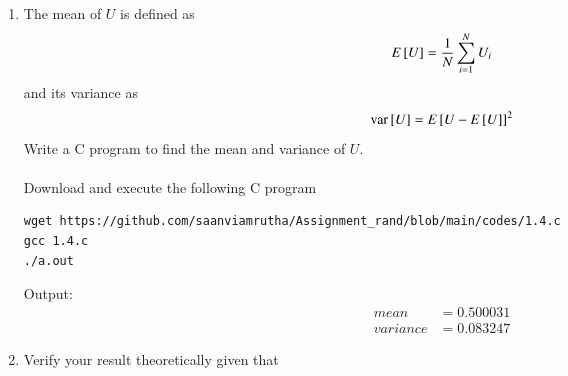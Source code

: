 \documentclass[journal,12pt,twocolumn]{IEEEtran}
\renewcommand\thesection{\arabic{section}}
\begin{document}
\begin{enumerate}[label=\thesection.\arabic*
,ref=\thesection.\theenumi]
\begin{enumerate}[label=case.\arabic*:]
\begin{align}
        F_{U}(x) &= \int_{-\infty}^x p_{U}(x) ~\mathrm{d}x\\
        &= \int_{-\infty}^x 0 ~\mathrm{d}x\\
        &=0
    \end{align}
    \item if $x\in [0, 1]$
    \begin{align}
        F_{U}(x) &= \int_{-\infty}^x p_{U}(x) ~\mathrm{d}x\\
        &= \int_{-\infty}^0 0 ~\mathrm{d}x + \int_{0}^x 1 ~\mathrm{d}x\\
        &=x
    \end{align}
    \item if $x>1$
    \begin{align}
        F_{U}(x) &= \int_{-\infty}^x p_{U}(x) ~\mathrm{d}x\\
        &= \int_{-\infty}^0 0 ~\mathrm{d}x + \int_{0}^1 1 ~\mathrm{d}x+\int_{1}^x 0 ~\mathrm{d}x\\
        &=1
    \end{align}
\end{enumerate}
\begin{align}
		F_{U}(x) = 
		\begin{cases}
		    0 & x<0\\
			x & x \in [0, 1] \\
			1 & x>1
		\end{cases}\label{eq:eq1}
	\end{align}

\item
The mean of $U$ is defined as
%
\begin{equation}
E{}\left[U\right] = \frac{1}{N}\sum_{i=1}^{N}U_i
\end{equation}
%
and its variance as
%
\begin{equation}
\text{var}{}\left[U\right] = E{}\left[U- E{}\left[U\right]\right]^2 
\end{equation}
Write a C program to  find the mean and variance of $U$. 
\\ \solution\\
Download and execute the following C program
\begin{lstlisting}
wget https://github.com/saanviamrutha/Assignment_rand/blob/main/codes/1.4.c
gcc 1.4.c
./a.out
\end{lstlisting}
Output:\\
\begin{align}
mean&=0.500031 \\
variance&=0.083247 
\end{align}
\item Verify your result theoretically given that
\end{enumerate}
\end{document}
